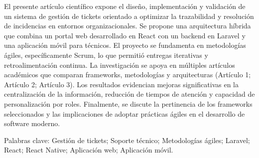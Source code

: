El presente artículo científico expone el diseño, implementación y validación de un sistema de gestión de tickets orientado a optimizar la trazabilidad y resolución de incidencias en entornos organizacionales. Se propone una arquitectura híbrida que combina un portal web desarrollado en React con un backend en Laravel y una aplicación móvil para técnicos. El proyecto se fundamenta en metodologías ágiles, específicamente Scrum, lo que permitió entregas iterativas y retroalimentación continua. La investigación se apoya en múltiples artículos académicos que comparan frameworks, metodologías y arquitecturas (Artículo 1; Artículo 2; Artículo 3). Los resultados evidencian mejoras significativas en la centralización de la información, reducción de tiempos de atención y capacidad de personalización por roles. Finalmente, se discute la pertinencia de los frameworks seleccionados y las implicaciones de adoptar prácticas ágiles en el desarrollo de software moderno.

Palabras clave: Gestión de tickets; Soporte técnico; Metodologías ágiles; Laravel; React; React Native; Aplicación web; Aplicación móvil.